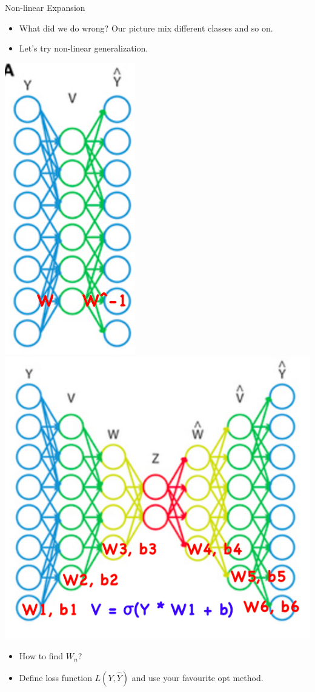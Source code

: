 \documentclass{beamer}
\begin{document}
\begin{frame}{Non-linear Expansion}
	\begin{itemize}
		\item What did we do wrong? Our picture mix different classes and so on.
		\item Let's try non-linear generalization.
	\end{itemize}
	
	 \begin{center}
	 	\includegraphics[scale=0.3]{img/fcautoenc1} ~~~\includegraphics[scale=0.25]{img/fcautoenc2}		 
	 \end{center}
	
	\begin{itemize}
		\item How to find $W_n$? 
		\item Define loss function $L(Y, \hat{Y})$ and  use your favourite opt method.
	\end{itemize}
\end{frame}
\end{document}
